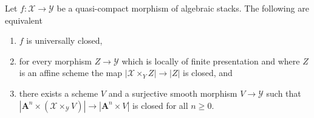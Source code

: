 %
\begin{lemma}
\label{lemma-test-universally-closed}
Let $f : \mathcal{X} \to \mathcal{Y}$ be a quasi-compact morphism of
algebraic stacks. The following are equivalent
\begin{enumerate}
\item $f$ is universally closed,
\item for every morphism $Z \to \mathcal{Y}$ which is locally of finite
presentation and where $Z$ is an affine scheme
the map $|\mathcal{X} \times_Y Z| \to |Z|$ is closed, and
\item there exists a scheme $V$ and a surjective smooth morphism
$V \to \mathcal{Y}$ such that
$|\mathbf{A}^n \times (\mathcal{X} \times_\mathcal{Y} V)|
\to |\mathbf{A}^n \times V|$ is closed for all $n \geq 0$.
\end{enumerate}
\end{lemma}

